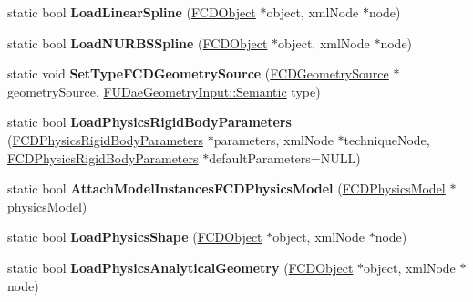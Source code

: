 \begin{DoxyCompactItemize}
\item 
\hypertarget{classFArchiveXML_a8b584c08ceb7b26668d37ef6d5a56d1d}{
static bool {\bfseries LoadLinearSpline} (\hyperlink{classFCDObject}{FCDObject} $\ast$object, xmlNode $\ast$node)}
\label{classFArchiveXML_a8b584c08ceb7b26668d37ef6d5a56d1d}

\item 
\hypertarget{classFArchiveXML_a48c403aa203b02ea9a7a17957cf49fe0}{
static bool {\bfseries LoadNURBSSpline} (\hyperlink{classFCDObject}{FCDObject} $\ast$object, xmlNode $\ast$node)}
\label{classFArchiveXML_a48c403aa203b02ea9a7a17957cf49fe0}

\item 
\hypertarget{classFArchiveXML_a4c3548f119f2bb0c585f95ea44eba284}{
static void {\bfseries SetTypeFCDGeometrySource} (\hyperlink{classFCDGeometrySource}{FCDGeometrySource} $\ast$geometrySource, \hyperlink{namespaceFUDaeGeometryInput_a0f887d29f54b10338ebcf73789a7a061}{FUDaeGeometryInput::Semantic} type)}
\label{classFArchiveXML_a4c3548f119f2bb0c585f95ea44eba284}

\item 
\hypertarget{classFArchiveXML_aefcf31bf5c792c5ee9e961d2e781a4fa}{
static bool {\bfseries LoadPhysicsRigidBodyParameters} (\hyperlink{classFCDPhysicsRigidBodyParameters}{FCDPhysicsRigidBodyParameters} $\ast$parameters, xmlNode $\ast$techniqueNode, \hyperlink{classFCDPhysicsRigidBodyParameters}{FCDPhysicsRigidBodyParameters} $\ast$defaultParameters=NULL)}
\label{classFArchiveXML_aefcf31bf5c792c5ee9e961d2e781a4fa}

\item 
\hypertarget{classFArchiveXML_a984772ce7a60a0d21642939bd1421078}{
static bool {\bfseries AttachModelInstancesFCDPhysicsModel} (\hyperlink{classFCDPhysicsModel}{FCDPhysicsModel} $\ast$physicsModel)}
\label{classFArchiveXML_a984772ce7a60a0d21642939bd1421078}

\item 
\hypertarget{classFArchiveXML_a64acef1ffd5aba18564d2c7b9b870376}{
static bool {\bfseries LoadPhysicsShape} (\hyperlink{classFCDObject}{FCDObject} $\ast$object, xmlNode $\ast$node)}
\label{classFArchiveXML_a64acef1ffd5aba18564d2c7b9b870376}

\item 
\hypertarget{classFArchiveXML_ae46a2616d1919f184268991daa937d95}{
static bool {\bfseries LoadPhysicsAnalyticalGeometry} (\hyperlink{classFCDObject}{FCDObject} $\ast$object, xmlNode $\ast$node)}
\label{classFArchiveXML_ae46a2616d1919f184268991daa937d95}


\end{DoxyCompactItemize}
